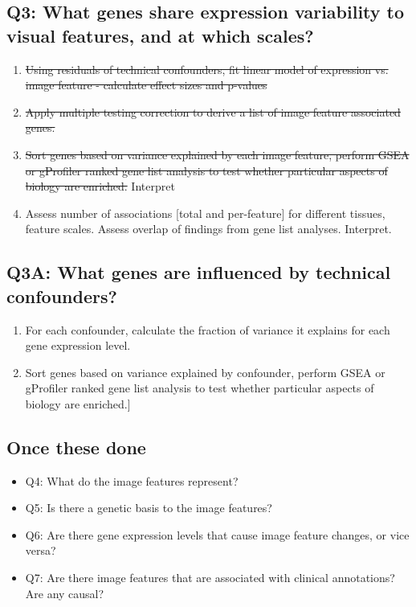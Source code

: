 \documentclass{article}
\begin{document}
\subsection*{Q3: What genes share expression variability to visual features, and at which scales?}
\begin{enumerate}
\item \sout{Using residuals of technical confounders, fit linear model of expression vs. image feature - calculate effect sizes and p-values}

\item \sout{Apply multiple testing correction to derive a list of image feature associated genes.}

\item \sout{Sort genes based on variance explained by each image feature, perform GSEA or gProfiler ranked gene list analysis to test whether particular aspects of biology are enriched.} Interpret

\item Assess number of associations [total and per-feature] for different tissues, feature scales. Assess overlap of findings from gene list analyses. Interpret.
\end{enumerate}

\subsection*{Q3A: What genes are influenced by technical confounders?}
\begin{enumerate}

\item For each confounder, calculate the fraction of variance it explains for each gene expression level. 

\item Sort genes based on variance explained by confounder, perform GSEA or gProfiler ranked gene list analysis to test whether particular aspects of biology are enriched.]

\end{enumerate}

\subsection*{Once these done}
\begin{itemize}
\item Q4: What do the image features represent?
\item Q5: Is there a genetic basis to the image features?
\item Q6: Are there gene expression levels that cause image feature changes, or vice versa?
\item Q7: Are there image features that are associated with clinical annotations? Are any causal?

\end{itemize}
\end{document}
